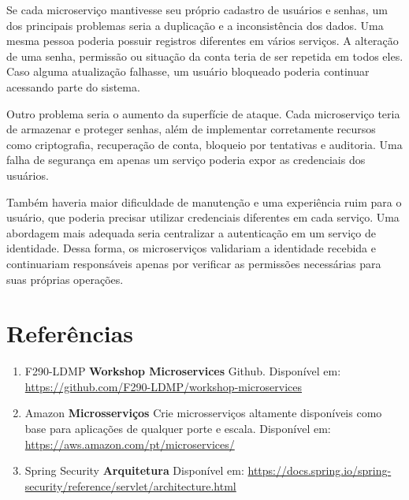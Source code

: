 \documentclass[12pt,a4paper]{article}
\begin{document}
Se cada microserviço mantivesse seu próprio cadastro de usuários e senhas, um dos principais problemas seria a duplicação e a inconsistência dos dados. Uma mesma pessoa poderia possuir registros diferentes em vários serviços. A alteração de uma senha, permissão ou situação da conta teria de ser repetida em todos eles. Caso alguma atualização falhasse, um usuário bloqueado poderia continuar acessando parte do sistema.

Outro problema seria o aumento da superfície de ataque. Cada microserviço teria de armazenar e proteger senhas, além de implementar corretamente recursos como criptografia, recuperação de conta, bloqueio por tentativas e auditoria. Uma falha de segurança em apenas um serviço poderia expor as credenciais dos usuários.

Também haveria maior dificuldade de manutenção e uma experiência ruim para o usuário, que poderia precisar utilizar credenciais diferentes em cada serviço. Uma abordagem mais adequada seria centralizar a autenticação em um serviço de identidade. Dessa forma, os microserviços validariam a identidade recebida e continuariam responsáveis apenas por verificar as permissões necessárias para suas próprias operações.

\section*{Referências}

\begin{enumerate}[leftmargin=*]

\item F290-LDMP
\textbf{Workshop Microservices}
Github. Disponível em:
\url{https://github.com/F290-LDMP/workshop-microservices}

\item Amazon
\textbf{Microsserviços}
Crie microsserviços altamente disponíveis como base para aplicações de qualquer porte e escala. Disponível em:
\url{https://aws.amazon.com/pt/microservices/}

\item Spring Security
\textbf{Arquitetura}
Disponível em:
\url{https://docs.spring.io/spring-security/reference/servlet/architecture.html}

\end{enumerate}
\end{document}
